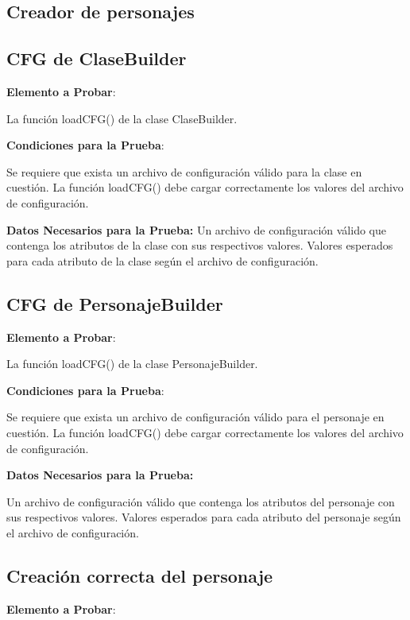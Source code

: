 \documentclass{article}
\begin{document}
\begin{itemize}
\subsection{Creador de personajes}

\subsection{CFG de ClaseBuilder}

\textbf{Elemento a Probar}: 

La función loadCFG() de la clase ClaseBuilder.

\textbf{Condiciones para la Prueba}:

        Se requiere que exista un archivo de configuración válido para la clase en cuestión.
        La función loadCFG() debe cargar correctamente los valores del archivo de configuración.
   
\textbf{ Datos Necesarios para la Prueba:}
        Un archivo de configuración válido que contenga los atributos de la clase con sus respectivos valores.
        Valores esperados para cada atributo de la clase según el archivo de configuración.

\subsection{CFG de PersonajeBuilder}

\textbf{Elemento a Probar}:

 La función loadCFG() de la clase PersonajeBuilder.

\textbf{Condiciones para la Prueba}:

        Se requiere que exista un archivo de configuración válido para el personaje en cuestión.
        La función loadCFG() debe cargar correctamente los valores del archivo de configuración.
        
    \textbf{Datos Necesarios para la Prueba:}
    
        Un archivo de configuración válido que contenga los atributos del personaje con sus respectivos valores.
        Valores esperados para cada atributo del personaje según el archivo de configuración.

\subsection{Creación correcta del personaje}

   \textbf{ Elemento a Probar}: 
   

\end{itemize}
\end{document}
